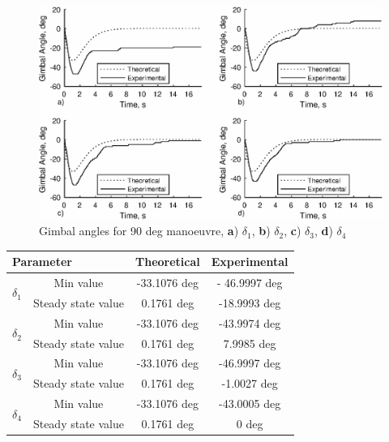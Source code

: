 \documentclass[aerospace,article,submit,moreauthors,dvi2pdf]{Definitions/mdpi}
\begin{document}
\begin{figure}[H]
\includegraphics[width=13cm]{angles90.eps}
\caption{Gimbal angles for 90 deg manoeuvre, \textbf{a}) $\delta_1$, \textbf{b}) $\delta_2$, \textbf{c}) $\delta_3$, \textbf{d}) $\delta_4$ \label{fig:angles90}}
\end{figure}

\begin{specialtable}[H] 
\caption{\label{table:gimbalvalues90} 90 deg Manoeuvre - Gimbal angle values}
\begin{tabular}{lc|cc}
\toprule
\multicolumn{2}{l}{\textbf{Parameter} } & \textbf{Theoretical} & \textbf{Experimental}   \\
\midrule
\multirow{2}{*}{$\delta_1$} & Min value                     &-33.1076 deg & - 46.9997 deg   \\
                                    & Steady state value       &0.1761 deg & -18.9993 deg      \\
\multirow{2}{*}{$\delta_2$} & Min value                     &-33.1076 deg & -43.9974 deg       \\
                                    & Steady state value      &0.1761 deg  & 7.9985  deg     \\
\multirow{2}{*}{$\delta_3$} & Min value                    &-33.1076 deg  & -46.9997 deg    \\
                                    & Steady state value      &0.1761 deg  & -1.0027  deg     \\
\multirow{2}{*}{$\delta_4$} & Min value                    &-33.1076 deg  & -43.0005 deg        \\
                                    & Steady state value      &0.1761 deg  & 0 deg     \\
\bottomrule
\end{tabular}
\end{specialtable}
\end{document}
